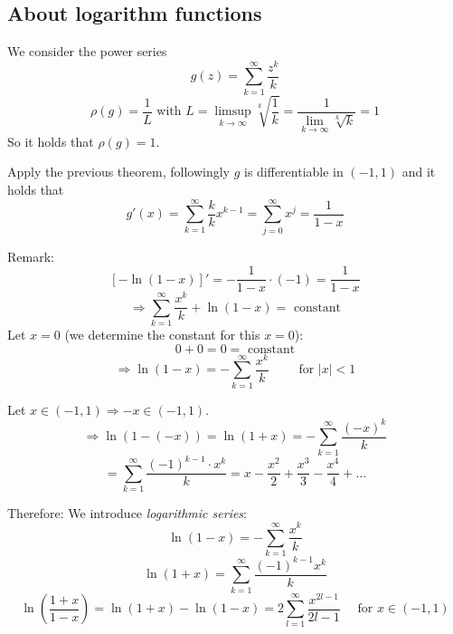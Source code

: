\documentclass[a4paper,landscape,twocolumn]{article}
\theoremstyle{definition}
\newcommand\abs[1]{\left|#1\right|}
\begin{document}
\subsection{About logarithm functions}
%
We consider the power series
\[ g(z) = \sum_{k=1}^\infty \frac{z^k}{k} \]
\[ \rho(g) = \frac1L \text{ with } L = \limsup_{k\to\infty} \sqrt[k]{\frac1k} = \frac{1}{\lim_{k\to\infty} \sqrt[k]{k}} = 1 \]
So it holds that $\rho(g) = 1$.

Apply the previous theorem, followingly $g$ is differentiable in $(-1,1)$ and it holds that
\[ g'(x) = \sum_{k=1}^\infty \frac{k}{k} x^{k-1} = \sum_{j=0}^\infty x^j = \frac1{1 - x} \]

Remark:
\[ \left[-\ln(1 - x)\right]' = -\frac{1}{1 - x} \cdot (-1) = \frac1{1 - x} \]
\[ \Rightarrow \sum_{k=1}^\infty \frac{x^k}{k} + \ln(1 - x) = \text{ constant} \]
Let $x = 0$ (we determine the constant for this $x=0$):
\[ 0 + 0 = 0 = \text{ constant} \]
\[ \Rightarrow \ln(1 - x) = -\sum_{k=1}^\infty \frac{x^k}{k} \qquad \text{ for } \abs{x} < 1 \]

Let $x \in (-1,1) \Rightarrow -x \in (-1,1)$.
\[ \Rightarrow \ln(1 - (-x)) = \ln(1 + x) = -\sum_{k=1}^\infty \frac{(-x)^k}{k} \]
\[ = \sum_{k=1}^\infty \frac{(-1)^{k-1} \cdot x^k}{k} = x - \frac{x^2}{2} + \frac{x^3}{3} - \frac{x^4}{4} + \ldots \]

Therefore: We introduce \emph{logarithmic series}:
\[ \ln(1 - x) = -\sum_{k=1}^\infty \frac{x^k}{k} \]
\[ \ln(1 + x) = \sum_{k=1}^\infty \frac{(-1)^{k-1} x^k}{k} \]
\[
  \ln\left(\frac{1 + x}{1 - x}\right)
  = \ln(1 + x) - \ln(1 - x)
  = 2 \sum_{l=1}^\infty \frac{x^{2l - 1}}{2l - 1}
  \quad \text{ for } x \in (-1,1)
\]
\end{document}
